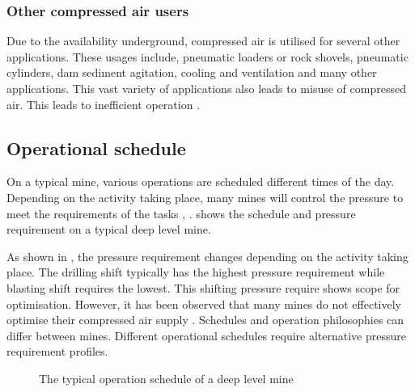\subsubsection{Other compressed air users}
Due to the availability underground, compressed air is utilised for several other applications. These usages include, pneumatic loaders or rock shovels, pneumatic cylinders, dam sediment agitation, cooling and ventilation and many other applications. This vast variety of applications also leads to misuse of compressed air. This leads to inefficient operation  \cite{Marais2012PhD}.
\subsection{Operational schedule}
On a typical mine, various operations are scheduled different times of the day. Depending on the activity taking place, many mines will control the pressure to meet the requirements of the tasks \cite{Marais2012PhD}, \cite{Kriel2014Masters}.  shows the schedule and pressure requirement on a typical deep level mine.
\par 
As shown in , the pressure requirement changes depending on the activity taking place. The drilling shift typically has the highest pressure requirement while blasting shift requires the lowest. This shifting pressure require shows scope for optimisation. However, it has been observed that many mines do not effectively optimise their compressed air supply \cite{padachi2009energy}.
Schedules and operation philosophies can differ between mines. Different operational schedules require alternative pressure requirement profiles.
\par 
\begin{figure}[!htbp]
	\centering
	\fbox{}
	\caption[A typical operation schedule of a deep level mine]{The typical operation schedule of a deep level mine \cite{Kriel2014Masters}}
	\label{fig: Mining schedule}
\end{figure}
